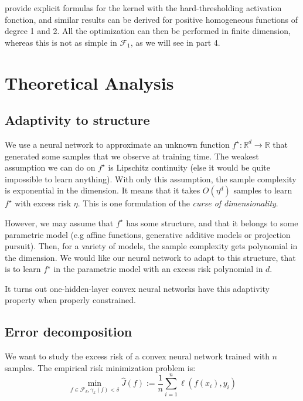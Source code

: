 \documentclass[a4paper, 11pt]{scrartcl}
\begin{document}
{\cite{le2007continuous} provide explicit formulas for the kernel with the hard-thresholding activation fonction, and similar results can be derived for positive homogeneous functions of degree 1 and 2. All the optimization can then be performed in finite dimension, whereas this is not as simple in $\mathcal{F}_1$, as we will see in part 4.

\section{Theoretical Analysis}

\subsection{Adaptivity to structure}

We use a neural network to approximate an unknown function $f^\star : \mathbb{R}^d \rightarrow \mathbb{R}$ that generated some samples that we observe at training time. The weakest assumption we can do on $f^\star$ is Lipschitz continuity (else it would be quite impossible to learn anything). With only this assumption, the sample complexity is exponential in the dimension. It means that it takes $O(\eta^{d})$ samples to learn $f^\star$ with excess risk $\eta$. This is one formulation of the \textit{curse of dimensionality}.

However, we may assume that $f^\star$ has some structure, and that it belongs to some parametric model (e.g affine functions, generative additive models or projection pursuit). Then, for a variety of models, the sample complexity gets polynomial in the dimension. We would like our neural network to adapt to this structure, that is to learn $f^\star$ in the parametric model with an excess risk polynomial in $d$.

It turns out one-hidden-layer convex neural networks have this adaptivity property when properly constrained. 

\subsection{Error decomposition}

We want to study the excess risk of a convex neural network trained with $n$ samples. The empirical risk minimization problem is:
\begin{equation}
\min_{f \in \mathcal{F}_k, \gamma_k(f)<\delta} \hat J(f) := \frac{1}{n} \sum_{i=1}^n \ell(f(x_i), y_i)
\end{equation}

}
\end{document}
